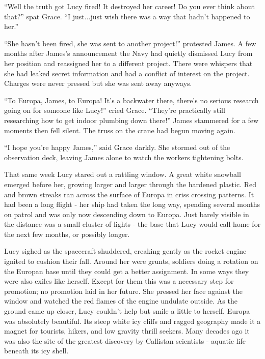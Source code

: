 \documentclass[12pt]{article} %
\begin{document}
``Well the truth got Lucy fired! It destroyed her career! Do you ever think about that?'' spat Grace. ``I just...just wish there was a way that hadn't happened to her.''

``She hasn't been fired, she was sent to another project!'' protested James. A few months after James's announcement the Navy had quietly dismissed Lucy from her position and reassigned her to a different project. There were whispers that she had leaked secret information and had a conflict of interest on the project. Charges were never pressed but she was sent away anyways.

``To Europa, James, to Europa! It's a backwater there, there's no serious research going on for someone like Lucy!'' cried Grace. ``They're practically still researching how to get indoor plumbing down there!'' James stammered for a few moments then fell silent. The truss on the crane had begun moving again.

``I hope you're happy James,'' said Grace darkly. She stormed out of the observation deck, leaving James alone to watch the workers tightening bolts.

That same week Lucy stared out a rattling window. A great white snowball emerged before her, growing larger and larger through the hardened plastic. Red and brown streaks ran across the surface of Europa in criss crossing patterns. It had been a long flight - her ship had taken the long way, spending several months on patrol and was only now descending down to Europa. Just barely visible in the distance was a small cluster of lights - the base that Lucy would call home for the next few months, or possibly longer.

Lucy sighed as the spacecraft shuddered, creaking gently as the rocket engine ignited to cushion their fall. Around her were grunts, soldiers doing a rotation on the Europan base until they could get a better assignment. In some ways they were also exiles like herself. Except for them this was a necessary step for promotion; no promotion laid in her future. She pressed her face against the window and watched the red flames of the engine undulate outside. As the ground came up closer, Lucy couldn't help but smile a little to herself. Europa was absolutely beautiful. Its steep white icy cliffs and ragged geography made it a magnet for tourists, hikers, and low gravity thrill seekers. Many decades ago it was also the site of the greatest discovery by Callistan scientists - aquatic life beneath its icy shell.
\end{document}
